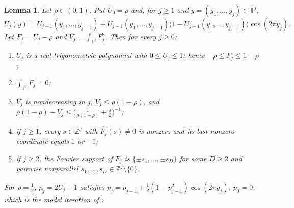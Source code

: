 \documentclass[11pt,reqno]{amsart}
\newtheorem{lemma}[theorem]{Lemma}
\theoremstyle{definition}
\newcommand{\T}{\mathbb{T}}
\newcommand{\Z}{\mathbb{Z}}
\begin{document}
\begin{lemma}\label{lem:model}
Let $\rho\in(0,1)$. Put $U_0=\rho$ and, for $j\ge1$ and $y=(y_1,\dots,y_j)\in\T^j$,
\[
U_j(y)=U_{j-1}(y_1,\dots,y_{j-1})+U_{j-1}(y_1,\dots,y_{j-1})\big(1-U_{j-1}(y_1,\dots,y_{j-1})\big)\cos(2\pi y_j).
\]
Let $F_j=U_j-\rho$ and $V_j=\int_{\T^j}F_j^2$. Then for every $j\ge0$:
\begin{enumerate}
\item[(a)] $U_j$ is a real trigonometric polynomial with $0\le U_j\le1$; hence $-\rho\le F_j\le1-\rho$;
\item[(b)] $\int_{\T^j}F_j=0$;
\item[(c)] $V_j$ is nondecreasing in $j$, $V_j\le\rho(1-\rho)$, and $\rho(1-\rho)-V_j\le\big(\frac1{\rho(1-\rho)}+\frac j2\big)^{-1}$;
\item[(d)] if $j\ge1$, every $s\in\Z^j$ with $\widehat{F_j}(s)\ne0$ is nonzero and its last nonzero coordinate equals $1$ or $-1$;
\item[(e)] if $j\ge2$, the Fourier support of $F_j$ is $\{\pm s_1,\dots,\pm s_D\}$ for some $D\ge2$ and pairwise nonparallel $s_1,\dots,s_D\in\Z^j\setminus\{0\}$.
\end{enumerate}
For $\rho=\frac12$, $p_j=2U_j-1$ satisfies $p_j=p_{j-1}+\frac12(1-p_{j-1}^2)\cos(2\pi y_j)$, $p_0=0$, which is the model iteration of \cite{AMM}.
\end{lemma}
\end{document}
